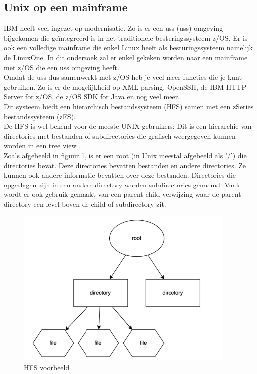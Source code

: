 \subsection{Unix op een mainframe}
IBM heeft veel ingezet op modernisatie. Zo is er een \acrlong{uss} (\acrshort{uss}) omgeving bijgekomen die geïntegreerd is in het traditionele besturingssysteem z/OS. Er is ook een volledige mainframe die enkel Linux heeft als besturingssysteem namelijk de LinuxOne. In dit onderzoek zal er enkel gekeken worden naar een mainframe met z/OS die een \acrshort{uss} omgeving heeft. \\

Omdat de \acrshort{uss} dus samenwerkt met z/OS heb je veel meer functies die je kunt gebruiken. Zo is er de mogelijkheid op XML parsing, OpenSSH, de IBM HTTP Server for z/OS, de z/OS SDK for Java en nog veel meer. \autocite{Dhawan2013} \\
 
Dit systeem biedt een hierarchisch bestandssysteem (HFS) samen met een zSeries bestandssysteem (zFS). \autocite{Precisely2020} \\ De HFS is wel bekend voor de meeste UNIX gebruikers: Dit is een hierarchie van directories met bestanden of subdirectories die grafisch weergegeven kunnen worden in een tree view \autocite{HCLTechnologies2022}. \\ 

Zoals afgebeeld in figuur \ref{fig:HFS}, is er een root (in Unix meestal afgebeeld als '/') die directories bevat. Deze directories bevatten bestanden en andere directories. Ze kunnen ook andere informatie bevatten over deze bestanden. Directories die opgeslagen zijn in een andere directory worden subdirectories genoemd. Vaak wordt er ook gebruik gemaakt van een parent-child verwijzing waar de parent directory een level boven de child of subdirectory zit. \autocite{Codecadamy2022} \\

\begin{figure}[pt!]
    \centering
    \includegraphics[width=300pt]{./graphics/HFS.png}
    \caption{HFS voorbeeld \autocite{Codecadamy2022}}
    \label{fig:HFS}
\end{figure}

